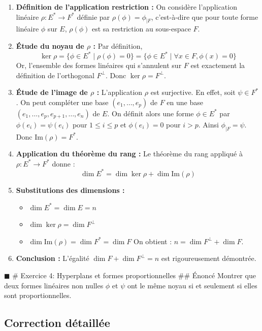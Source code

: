 \begin{enumerate}
\def\labelenumi{\arabic{enumi}.}
\tightlist
\item
  \textbf{Définition de l'application restriction :} On considère
  l'application linéaire \(\rho : E^* \to F^*\) définie par
  \(\rho(\phi) = \phi_{|F}\), c'est-à-dire que pour toute forme linéaire
  \(\phi\) sur \(E\), \(\rho(\phi)\) est sa restriction au sous-espace
  \(F\).
\item
  \textbf{Étude du noyau de \(\rho\) :} Par définition,
  \[\ker \rho = \{ \phi \in E^* \mid \rho(\phi) = 0 \} = \{ \phi \in E^* \mid \forall x \in F, \phi(x) = 0 \}\]
  Or, l'ensemble des formes linéaires qui s'annulent sur \(F\) est
  exactement la définition de l'orthogonal \(F^\perp\). Donc
  \(\ker \rho = F^\perp\).
\item
  \textbf{Étude de l'image de \(\rho\) :} L'application \(\rho\) est
  surjective. En effet, soit \(\psi \in F^*\). On peut compléter une
  base \((e_1, \dots, e_p)\) de \(F\) en une base
  \((e_1, \dots, e_p, e_{p+1}, \dots, e_n)\) de \(E\). On définit alors
  une forme \(\phi \in E^*\) par \(\phi(e_i) = \psi(e_i)\) pour
  \(1 \le i \le p\) et \(\phi(e_i) = 0\) pour \(i > p\). Ainsi
  \(\phi_{|F} = \psi\). Donc \(\text{Im}(\rho) = F^*\).
\item
  \textbf{Application du théorème du rang :} Le théorème du rang
  appliqué à \(\rho : E^* \to F^*\) donne :
  \[\dim E^* = \dim \ker \rho + \dim \text{Im}(\rho)\]
\item
  \textbf{Substitutions des dimensions :}

  \begin{itemize}
  \tightlist
  \item
    \(\dim E^* = \dim E = n\)
  \item
    \(\dim \ker \rho = \dim F^\perp\)
  \item
    \(\dim \text{Im}(\rho) = \dim F^* = \dim F\) On obtient :
    \(n = \dim F^\perp + \dim F\).
  \end{itemize}
\item
  \textbf{Conclusion :} L'égalité \(\dim F + \dim F^\perp = n\) est
  rigoureusement démontrée.
\end{enumerate}

\(\blacksquare\) \# Exercice 4: Hyperplans et formes proportionnelles
\#\# Énoncé Montrer que deux formes linéaires non nulles \(\phi\) et
\(\psi\) ont le même noyau si et seulement si elles sont
proportionnelles.

\hypertarget{correction-duxe9tailluxe9e-3}{%
\subsection{Correction détaillée}\label{correction-duxe9tailluxe9e-3}}

